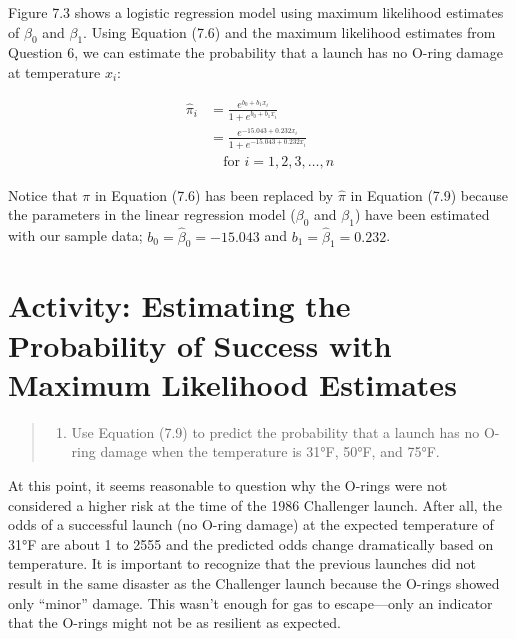 \documentclass[
]{report}
\providecommand{\tightlist}{%
  \setlength{\itemsep}{0pt}\setlength{\parskip}{0pt}}
\begin{document}
Figure 7.3 shows a logistic regression model using maximum likelihood estimates of \(\beta_0\) and \(\beta_1\). Using Equation (7.6) and the maximum likelihood estimates from Question 6, we can estimate the probability that a launch has no O-ring damage at temperature \(x_i\):

\begin{align}
\hat\pi_i 
&= \frac{e^{b_0 + b_1 x_i}}{1 + e^{b_0 + b_1 x_i}} \\
&= \frac{e^{-15.043 + 0.232 x_i}}{1 + e^{-15.043 + 0.232 x_i}} \\
&\quad \text{for } i = 1,2,3,\dots,n \tag{7.9}
\end{align}

Notice that \(\pi\) in Equation (7.6) has been replaced by \(\hat\pi\) in Equation (7.9) because the parameters in the linear regression model (\(\beta_0\) and \(\beta_1\)) have been estimated with our sample data; \(b_0 = \hat\beta_0 = -15.043\) and \(b_1 = \hat\beta_1 = 0.232\).

\section*{Activity: Estimating the Probability of Success with Maximum Likelihood Estimates}\label{activity-estimating-the-probability-of-success-with-maximum-likelihood-estimates}

\begin{quote}
\begin{enumerate}
\def\labelenumi{\arabic{enumi}.}
\setcounter{enumi}{6}
\tightlist
\item
  Use Equation (7.9) to predict the probability that a launch has no O-ring damage when the temperature is 31°F, 50°F, and 75°F.
\end{enumerate}
\end{quote}

At this point, it seems reasonable to question why the O-rings were not considered a higher risk at the time of the 1986 Challenger launch. After all, the odds of a successful launch (no O-ring damage) at the expected temperature of 31°F are about 1 to 2555 and the predicted odds change dramatically based on temperature. It is important to recognize that the previous launches did not result in the same disaster as the Challenger launch because the O-rings showed only ``minor'' damage. This wasn't enough for gas to escape---only an indicator that the O-rings might not be as resilient as expected.
\end{document}

